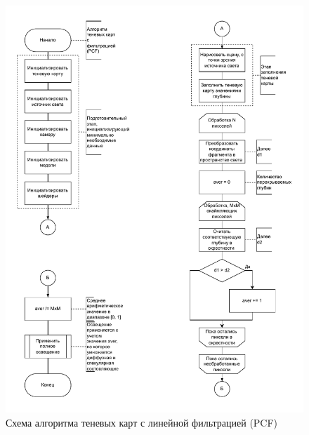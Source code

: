 \begin{figure}[h]
    \centering
    \includegraphics[width=\textwidth]{charts/shadow_map_pcf.pdf}
    \caption{Схема алгоритма теневых карт с линейной фильтрацией (PCF)}
    \label{chart:shadow_map_pcf}
\end{figure}
\FloatBarrier
